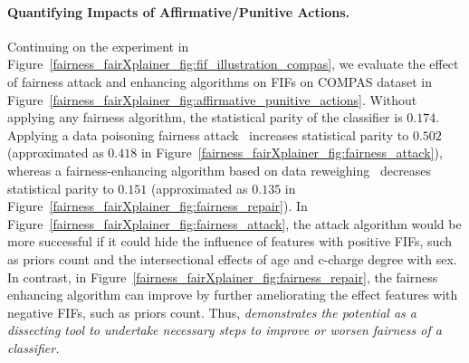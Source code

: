 \paragraph{Quantifying Impacts of Affirmative/Punitive Actions.} Continuing on the experiment in Figure~\ref{fairness_fairXplainer_fig:fif_illustration_compas}, we evaluate the effect of fairness attack and enhancing algorithms on FIFs on COMPAS dataset in Figure~\ref{fairness_fairXplainer_fig:affirmative_punitive_actions}.  Without applying any fairness algorithm, the statistical parity of the classifier is $ 0.174 $. Applying a data poisoning fairness attack~\cite{solans2020poisoning} increases statistical parity to $ 0.502 $ (approximated as $ 0.418 $ in Figure~\ref{fairness_fairXplainer_fig:fairness_attack}), whereas  a fairness-enhancing algorithm based on data reweighing~\cite{kamiran2012data} decreases statistical parity to $ 0.151 $ (approximated as $ 0.135 $ in Figure~\ref{fairness_fairXplainer_fig:fairness_repair}). In Figure~\ref{fairness_fairXplainer_fig:fairness_attack}, the attack algorithm would be more successful if it could hide the influence of features with positive FIFs, such as priors count and the intersectional effects of age and c-charge degree with sex. In contrast, in Figure~\ref{fairness_fairXplainer_fig:fairness_repair}, the fairness enhancing algorithm can improve by  further ameliorating the effect features with  negative FIFs, such as priors count. Thus, \textit{{\fairXplainer} demonstrates the potential as a dissecting tool to undertake necessary steps to improve or worsen fairness of a classifier.}





